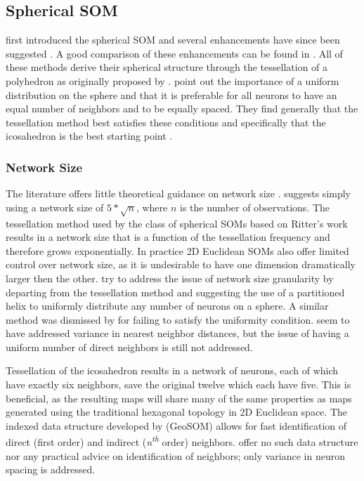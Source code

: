 \documentclass[11pt]{article}
\begin{document}
\subsection{Spherical SOM}
\cite{ritter99} first introduced the spherical SOM and several
enhancements have since been suggested 
\citep{boudjemai2003,sangole03,Nishio:2006fk,Wu:2006lr}.  A good
comparison of these enhancements can be found in \citep{Wu:2006lr}.  All of
these methods derive their spherical structure through the tessellation of a
polyhedron as originally proposed by \citeauthor{ritter99}.  \cite{Wu:2006lr}
point out the importance of a uniform distribution on the sphere and that it is
preferable for all neurons to have an equal number of neighbors and to be
equally spaced.  They find generally that the tessellation method best
satisfies these conditions and specifically that the icosahedron is the best
starting point \citep{wu2005}.

\subsubsection{Network Size}
The literature offers little theoretical guidance on network size
\citep{cho1996}.  \cite{toolbox} suggests simply using a network
size of \(5*\sqrt {n}\), where \(n\) is the number of observations.
The tessellation method used by the class of spherical SOMs
based on Ritter's work results in a network size that is a function of the
tessellation frequency and therefore grows exponentially. In practice 2D
Euclidean SOMs also offer limited control over network size, as it is
undesirable to have one dimension dramatically larger then the other.
\cite{Nishio:2006fk} try to address the issue of network size granularity by
departing from the tessellation method and suggesting the use of a partitioned
helix to uniformly distribute any number of neurons on a sphere.  A similar
method was dismissed by \cite{wu2005} for failing to satisfy the uniformity
condition.  \citeauthor{Nishio:2006fk} seem to have addressed variance in 
nearest neighbor distances, but the issue of having a uniform number of direct
neighbors is still not addressed.

Tessellation of the icosahedron results in a network of neurons, each of which
have exactly six neighbors, save the original twelve which each have five.
This is beneficial, as the resulting maps will share many of the same
properties as maps generated using the traditional hexagonal topology in 2D
Euclidean space. The indexed data structure developed by
\citeauthor{Wu:2006lr} (GeoSOM) allows for fast identification of direct
(first order) and indirect (\textit{n\textsuperscript{th}} order) neighbors.
\cite{Nishio:2006fk} offer no such data structure nor any practical advice on
identification of neighbors; only variance in neuron spacing is addressed.
\end{document}
